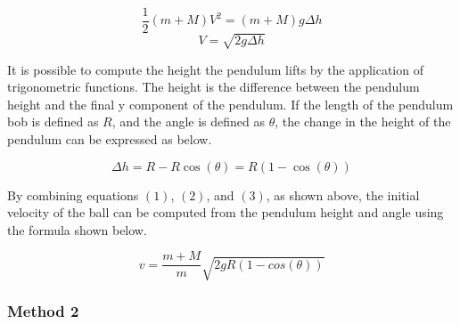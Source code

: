 \documentclass[11pt]{article}
\begin{document}
\[
\frac{1}{2}(m + M)V^2 = (m + M)g\Delta h
\]
\begin{equation}
V = \sqrt{2g \Delta h}
\end{equation}

It is possible to compute the height the pendulum lifts by the
application of trigonometric functions. The height is the difference
between the pendulum height and the final y component of the pendulum.
If the length of the pendulum bob is defined as \(R\), and the angle is
defined as \(\theta\), the change in the height of the pendulum can be
expressed as below.

\begin{equation}
\Delta h = R - R \cos(\theta) = R(1 - \cos(\theta))
\end{equation}

By combining equations \((1)\), \((2)\), and \((3)\), as shown above,
the initial velocity of the ball can be computed from the pendulum
height and angle using the formula shown below.

\begin{equation}
v = \frac {m + M}{m} \sqrt {2gR(1 - cos(\theta))}
\end{equation}

\hypertarget{method-2}{%
\subsubsection*{\centering Method 2}\label{method-2}}
\end{document}
